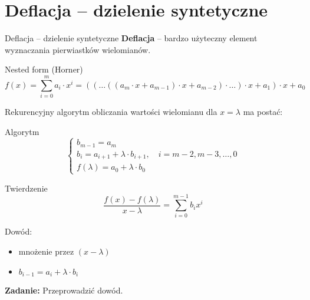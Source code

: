 \section{Deflacja -- dzielenie syntetyczne}

\begin{frame}{Deflacja -- dzielenie syntetyczne}
  \textbf{Deflacja} -- bardzo użyteczny element wyznaczania pierwiastków wielomianów. %

  \begin{block}{Nested form (Horner)}
    $$ f(x) = \sum_{i=0}^m a_i \cdot x^i = ( ( \dots (( a_m \cdot x + a_{m-1}) \cdot x + a_{m-2} ) \cdot \dots) \cdot x + a_1) \cdot x + a_0 $$
  \end{block}
\end{frame}

\begin{frame}
  Rekurencyjny algorytm obliczania wartości wielomianu dla $x = \lambda$ ma postać:

  \begin{block}{Algorytm}
    $$ \left \{ \begin{array}{l}
    b_{m-1} = a_m \\
    b_i = a_{i+1} + \lambda \cdot b_{i+1}, \quad i = m - 2, m-3, \dots, 0 \\
    f( \lambda ) = a_{0} + \lambda \cdot b_{0}
    \end{array} \right. $$
  \end{block}
\end{frame}

\begin{frame}

  \begin{block}{Twierdzenie}
    $$ \frac{f(x) - f(\lambda)}{x - \lambda} = \sum_{i=0}^{m-1} b_i x^i $$
  \end{block}
  
  Dowód:

  \begin{itemize}
    \item mnożenie przez $(x - \lambda)$
    \item $ b_{i-1} = a_i + \lambda \cdot b_i $
  \end{itemize}

  \vspace{5px}

  \textbf{Zadanie:} Przeprowadzić dowód.
\end{frame}
